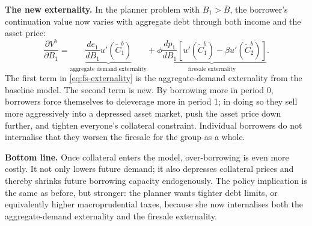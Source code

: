 \documentclass[11pt,a4paper]{article}
\begin{document}
\textbf{The new externality.} In the planner problem with $B_1>\bar{B}$, the borrower's continuation value now varies with aggregate debt through both income and the asset price:
\begin{equation}\label{eq:fs-externality}
\frac{\partial V^b}{\partial B_1}
=
\underbrace{\frac{de_1}{dB_1}u'(\tilde{C}_1^b)}_{\text{aggregate demand externality}}
+
\underbrace{\phi\frac{dp_1}{dB_1}\left[u'(\tilde{C}_1^b)-\beta u'(\tilde{C}_2^b)\right]}_{\text{firesale externality}}.
\end{equation}
The first term in \eqref{eq:fs-externality} is the aggregate-demand externality from the baseline model. The second term is new. By borrowing more in period 0, borrowers force themselves to deleverage more in period 1; in doing so they sell more aggressively into a depressed asset market, push the asset price down further, and tighten everyone's collateral constraint. Individual borrowers do not internalise that they worsen the firesale for the group as a whole.

\textbf{Bottom line.} Once collateral enters the model, over-borrowing is even more costly. It not only lowers future demand; it also depresses collateral prices and thereby shrinks future borrowing capacity endogenously. The policy implication is the same as before, but stronger: the planner wants tighter debt limits, or equivalently higher macroprudential taxes, because she now internalises both the aggregate-demand externality and the firesale externality.

\end{document}
